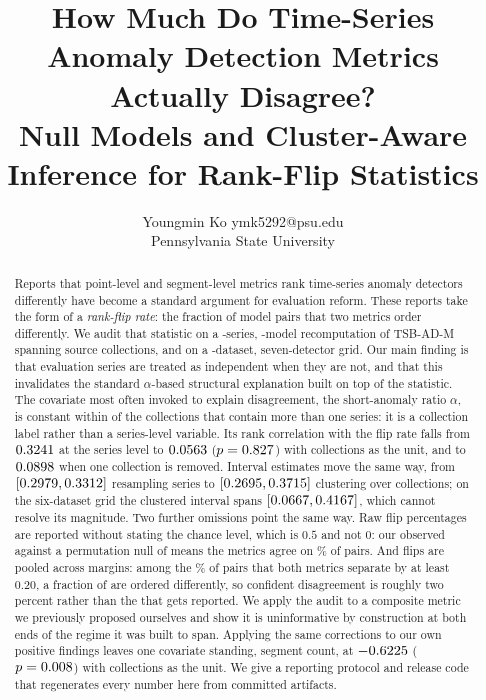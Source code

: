 \documentclass[twoside,11pt]{article}
\title{How Much Do Time-Series Anomaly Detection Metrics Actually Disagree?\\
Null Models and Cluster-Aware Inference for Rank-Flip Statistics}
\author{\name Youngmin Ko \email ymk5292@psu.edu \\
        \addr Pennsylvania State University}
\begin{document}
\maketitle

\begin{abstract}
Reports that point-level and segment-level metrics rank time-series anomaly
detectors differently have become a standard argument for evaluation reform.
These reports take the form of a \emph{rank-flip rate}: the fraction of model
pairs that two metrics order differently. We audit that statistic on a
\TsbadSeries-series, \TsbadModels-model recomputation of TSB-AD-M spanning
\TsbadCollections{} source collections, and on a \TabDatasets-dataset,
seven-detector grid. Our main finding is that evaluation series are treated as
independent when they are not, and that this invalidates the standard
$\alpha$-based structural explanation built on top of the statistic. The
covariate most often invoked to
explain disagreement, the short-anomaly ratio $\alpha$, is constant within
\ConstMultiAlpha{} of the \NMultiCollections{} collections that contain more
than one series: it is a collection label rather than a series-level variable. Its rank correlation with the flip rate
falls from $0.3241$ at the series level to $0.0563$
($p = 0.827$) with collections as the unit, and to $0.0898$ when one
collection is removed. Interval estimates move the same way, from
$[0.2979, 0.3312]$ resampling series to
$[0.2695, 0.3715]$ clustering over collections; on the
six-dataset grid the clustered interval spans
$[0.0667, 0.4167]$, which cannot resolve its
magnitude. Two further omissions point the same way. Raw flip
percentages are reported without stating the chance level, which is $0.5$ and
not $0$: our observed \TsbadFlipAff{} against a permutation null of
\TsbadNull{} means the metrics agree on \TsbadAgreePct\% of pairs. And flips are
pooled across margins: among the \TsbadJointShareTwoZero\% of pairs that both
metrics separate by at least $0.20$, a fraction of \TsbadJointTwoZero{} are
ordered differently, so confident disagreement is roughly two percent rather
than the \TsbadFlipAff{} that gets reported. We apply
the audit to a composite metric we previously proposed ourselves and show it is
uninformative by construction at both ends of the regime it was built to span.
Applying the same corrections to our own positive findings leaves one covariate
standing, segment count, at $-0.6225{}$
($p = 0.008{}$) with collections as the unit. We give a
reporting protocol and release code that regenerates every number here from
committed artifacts.
\end{abstract}
\end{document}
